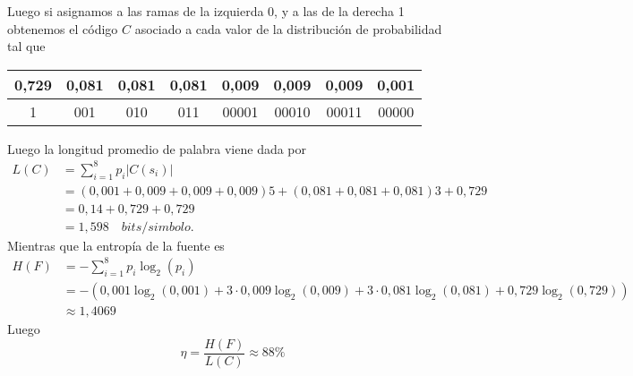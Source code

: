 \begin{sols}
\begin{center}
    \end{center}
Luego si asignamos a las ramas de la izquierda 0, y a las de la derecha 1 obtenemos el código $C$ asociado a cada valor de la distribución de probabilidad tal que
\begin{center}
    \begin{tabular}{|c|c|c|c|c|c|c|c|}
       \hline
        0,729& 0,081& 0,081& 0,081& 0,009& 0,009& 0,009& 0,001\\
        \hline
        1& 001& 010& 011 & 00001 &00010&00011&00000\\
        \hline
    \end{tabular}
\end{center}
Luego la longitud promedio de palabra viene dada por 
\begin{align*}
    L(C)&=\sum_{i=1}^8p_i|C(s_i)|\\
    &=(0,001+0,009+0,009+0,009)5+(0,081+0,081+0,081)3+0,729\\
    &=0,14+0,729+0,729\\
    &=1,598\quad bits/simbolo.
\end{align*}
Mientras que la entropía de la fuente es
\begin{align*}
    H(F)&=-\sum_{i=1}^8p_i\log_2(p_i)\\
    &=-(0,001\log_2(0,001)+3\cdot0,009\log_2(0,009)+3\cdot0,081\log_2(0,081)+0,729\log_2(0,729))\\
    &\approx 1,4069
\end{align*}
Luego
$$\eta=\frac{H(F)}{L(C)}\approx 88\%$$
\end{sols}